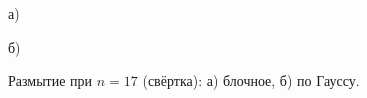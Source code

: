 \documentclass[a5paper, 10pt]{article}
\theoremstyle{definition}
\theoremstyle{plain}
\theoremstyle{remark}
\begin{document}
\begin{figure}[h!]
\begin{minipage}[h!]{0.47\linewidth}
 а) \\
\end{minipage}
\hfill
\begin{minipage}[h!]{0.47\linewidth}
 б) \\
\end{minipage}
\caption{Размытие при $n= 17$ (свёртка): а) блочное, б) по Гауссу.}
\end{figure}
\end{document}
